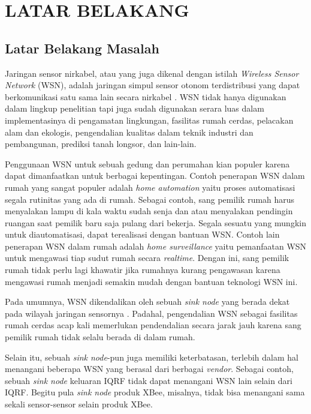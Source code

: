 
\chapter{LATAR BELAKANG}

\section{Latar Belakang Masalah}
Jaringan sensor nirkabel, atau yang juga dikenal dengan istilah \emph{Wireless Sensor Network} (WSN), adalah jaringan simpul sensor otonom terdistribusi yang dapat berkomunikasi satu sama lain secara nirkabel \cite{wibowo2013wireless,Raluca2008}. WSN tidak hanya digunakan dalam lingkup penelitian tapi juga sudah digunakan serara luas dalam implementasinya di pengamatan lingkungan, fasilitas rumah cerdas, pelacakan alam dan ekologis, pengendalian kualitas dalam teknik industri dan pembangunan, prediksi tanah longsor, dan lain-lain.

Penggunaan WSN untuk sebuah gedung dan perumahan kian populer \cite{Matsuura2007} karena dapat dimanfaatkan untuk berbagai kepentingan. Contoh penerapan WSN dalam rumah yang sangat populer adalah \emph{home automation} yaitu proses automatisasi segala rutinitas yang ada di rumah. Sebagai contoh, sang pemilik rumah harus menyalakan lampu di kala waktu sudah senja dan atau menyalakan pendingin ruangan saat pemilik baru saja pulang dari bekerja. Segala sesuatu yang mungkin untuk diautomatisasi, dapat terealisasi dengan bantuan WSN. Contoh lain penerapan WSN dalam rumah adalah \emph{home surveillance} yaitu pemanfaatan WSN untuk mengawasi tiap sudut rumah secara \emph{realtime}. Dengan ini, sang pemilik rumah tidak perlu lagi khawatir jika rumahnya kurang pengawasan karena mengawasi rumah menjadi semakin mudah dengan bantuan teknologi WSN ini.

Pada umumnya, WSN dikendalikan oleh sebuah \emph{sink node} yang berada dekat pada wilayah jaringan sensornya \cite{Lin2011}. Padahal, pengendalian WSN sebagai fasilitas rumah cerdas acap kali memerlukan pendendalian secara jarak jauh karena sang pemilik rumah tidak selalu berada di dalam rumah.

Selain itu, sebuah \emph{sink node}-pun juga memiliki keterbatasan, terlebih dalam hal menangani beberapa WSN yang berasal dari berbagai \emph{vendor}. Sebagai contoh, sebuah \emph{sink node} keluaran IQRF tidak dapat menangani WSN lain selain dari IQRF. Begitu pula \emph{sink node} produk XBee, misalnya, tidak bisa menangani sama sekali sensor-sensor selain produk XBee.

